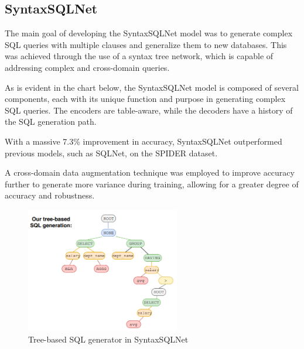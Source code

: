\subsection{SyntaxSQLNet}

The main goal of developing the SyntaxSQLNet model was to generate complex SQL queries with multiple clauses and generalize them to new databases.
This was achieved through the use of a syntax tree network, which is capable of addressing complex and cross-domain queries.

As is evident in the chart below, the SyntaxSQLNet model is composed of several components, each with its unique function and purpose in generating complex SQL queries. The encoders are table-aware, while the decoders have a history of the SQL generation path.

With a massive 7.3\% improvement in accuracy, SyntaxSQLNet outperformed previous models, such as SQLNet, on the SPIDER dataset.

A cross-domain data augmentation technique was employed to improve accuracy further to generate more variance during training, allowing for a greater degree of accuracy and robustness.

\begin{figure}[htb]
    \centering
    \includegraphics[width=0.6\textwidth]{pics/SyntaxSQLNet/Tree-based.png}
    \caption{Tree-based SQL generator in SyntaxSQLNet}
    \label{fig:tree-based}
\end{figure}


